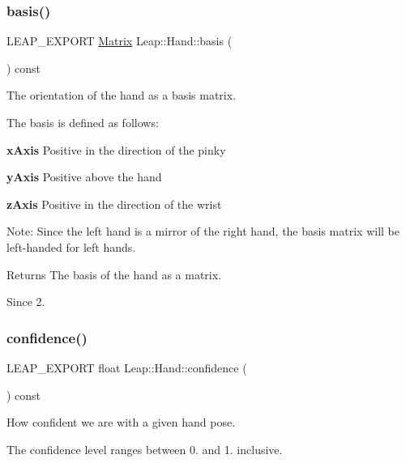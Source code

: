 \subsubsection{\texorpdfstring{basis()}{basis()}}
{\footnotesize\ttfamily L\+E\+A\+P\+\_\+\+E\+X\+P\+O\+RT \hyperlink{struct_leap_1_1_matrix}{Matrix} Leap\+::\+Hand\+::basis (\begin{DoxyParamCaption}{ }\end{DoxyParamCaption}) const}

The orientation of the hand as a basis matrix.

The basis is defined as follows\+:

{\bfseries x\+Axis} Positive in the direction of the pinky

{\bfseries y\+Axis} Positive above the hand

{\bfseries z\+Axis} Positive in the direction of the wrist

Note\+: Since the left hand is a mirror of the right hand, the basis matrix will be left-\/handed for left hands.


\begin{DoxyCodeInclude}
\end{DoxyCodeInclude}


\begin{DoxyReturn}{Returns}
The basis of the hand as a matrix. 
\end{DoxyReturn}
\begin{DoxySince}{Since}
2. 
\end{DoxySince}
\mbox{\label{class_leap_1_1_hand_ac28deea645d5e5119feccc05cf4dbbcf}} 
\subsubsection{\texorpdfstring{confidence()}{confidence()}}
{\footnotesize\ttfamily L\+E\+A\+P\+\_\+\+E\+X\+P\+O\+RT float Leap\+::\+Hand\+::confidence (\begin{DoxyParamCaption}{ }\end{DoxyParamCaption}) const}

How confident we are with a given hand pose.

The confidence level ranges between 0. and 1. inclusive.


\begin{DoxyCodeInclude}
\end{DoxyCodeInclude}


